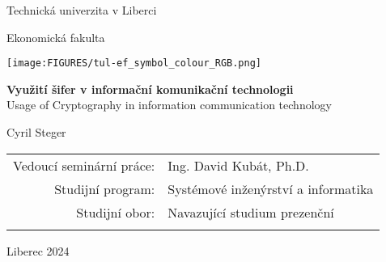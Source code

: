 \pagestyle{empty}
\begin{center}
    
    {\large Technická univerzita v Liberci}

    \medskip
    {\large Ekonomická fakulta}
    \vfill
    \centerline{\mbox{\texttt{[image: \\FIGURES/tul-ef\_symbol\_colour\_RGB.png]}}} %
    \vfill
    \vspace{5mm}
    {\LARGE\bfseries Využití šifer v informační komunikační technologii \\}
    \vspace{5mm}
    {\large Usage of Cryptography in information communication technology \\}

    \vfill
    \vspace{5mm}
    {\large Cyril Steger}
    
    \vfill
    \begin{tabular}{rl}
        Vedoucí seminární práce: &  Ing. David Kubát, Ph.D.\\   %
        \noalign{\vspace{2mm}}
        Studijní program: & Systémové inženýrství a informatika\\
        \noalign{\vspace{2mm}}
        Studijní obor: & Navazující studium prezenční\\
        \noalign{\vspace{2mm}}
    \end{tabular}
    \medskip

    \vfill
    {\large Liberec 2024}
    
\end{center}